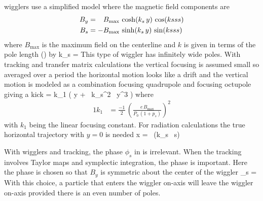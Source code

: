  wigglers use a simplified model where the magnetic
field components are
\begin{alignat}{1}
  B_y &= \hphantom{-} B_{\max} \, \cosh(k_s \, y) \, \cos(ksss) \nonumber \\
  B_s &= -B_{\max} \, \sinh(k_s \, y) \, \sin(ksss) 
  \label{bbkyks}
\end{alignat}
where $B_{\max}$ is the maximum field on the centerline and $k$ is
given in terms of the pole length () by
\Begineq
  k_s = 
\Endeq
This type of wiggler has infinitely wide poles. With
 tracking and transfer matrix calculations the
vertical focusing is assumed small so averaged over a period the
horizontal motion looks like a drift and the vertical motion is
modeled as a combination focusing quadrupole and focusing octupole
giving a kick\cite{b:corbett}
\Begineq
   = k_1 \left( y +  \, k_s^2 \, y^3 \right)
\Endeq
where
\begin{alignat}{1}
  k_1 &= \frac{-1}{2} \, \left( \frac{e \, B_{\max}}{P_0 \, (1 + p_s)} \right)^2 
\end{alignat}
with $k_1$ being the linear focusing constant. For radiation
calculations the true horizontal trajectory with $y = 0$ is needed
\Begineq
  x =  \, \cos (k_s \, s)
\Endeq

With  wigglers and  tracking, the
phase $\phi_s$ in  is irrelevant. When the tracking
involves Taylor maps and symplectic integration, the phase is
important. Here the phase is chosen so that $B_y$ is symmetric about
the center of the wiggler
\Begineq
  \phi_s = 
\Endeq
With this choice, a particle that enters the wiggler on-axis will
leave the wiggler on-axis provided there is an even number of poles.
